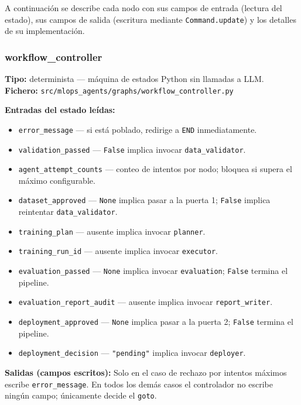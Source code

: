 A continuación se describe cada nodo con sus campos de entrada (lectura del estado),
sus campos de salida (escritura mediante \texttt{Command.update}) y los detalles de su implementación.

\subsubsection*{workflow\_controller}
\label{sec:nodo-controller}

\textbf{Tipo:} determinista --- máquina de estados Python sin llamadas a LLM.\\
\textbf{Fichero:} \texttt{src/mlops\_agents/graphs/workflow\_controller.py}

\textbf{Entradas del estado leídas:}
\begin{itemize}
  \item \texttt{error\_message} — si está poblado, redirige a \texttt{END} inmediatamente.
  \item \texttt{validation\_passed} — \texttt{False} implica invocar \texttt{data\_validator}.
  \item \texttt{agent\_attempt\_counts} — conteo de intentos por nodo; bloquea si supera el máximo configurable.
  \item \texttt{dataset\_approved} — \texttt{None} implica pasar a la puerta 1; \texttt{False} implica reintentar \texttt{data\_validator}.
  \item \texttt{training\_plan} — ausente implica invocar \texttt{planner}.
  \item \texttt{training\_run\_id} — ausente implica invocar \texttt{executor}.
  \item \texttt{evaluation\_passed} — \texttt{None} implica invocar \texttt{evaluation}; \texttt{False} termina el pipeline.
  \item \texttt{evaluation\_report\_audit} — ausente implica invocar \texttt{report\_writer}.
  \item \texttt{deployment\_approved} — \texttt{None} implica pasar a la puerta 2; \texttt{False} termina el pipeline.
  \item \texttt{deployment\_decision} — \texttt{"pending"} implica invocar \texttt{deployer}.
\end{itemize}

\textbf{Salidas (campos escritos):}
Solo en el caso de rechazo por intentos máximos escribe \texttt{error\_message}.
En todos los demás casos el controlador no escribe ningún campo; únicamente decide el \texttt{goto}.

